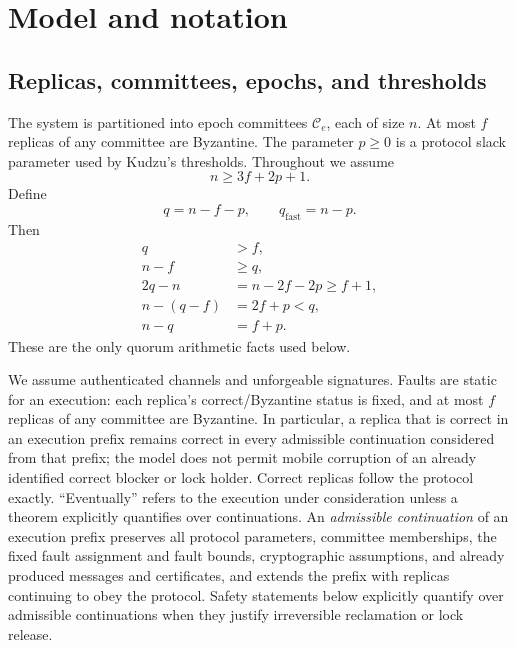 \documentclass[11pt]{article}
\theoremstyle{definition}
\theoremstyle{remark}
\newcommand{\C}{\mathcal C}
\begin{document}
\section{Model and notation}

\subsection{Replicas, committees, epochs, and thresholds}

The system is partitioned into epoch committees $\C_e$, each of size $n$. At most $f$ replicas of any committee are Byzantine. The parameter $p\ge0$ is a protocol slack parameter used by Kudzu's thresholds. Throughout we assume
\begin{equation}
  n\ge 3f+2p+1.
  \label{eq:resilience}
\end{equation}
Define
\begin{equation}
  q=n-f-p,
  \qquad
  q_{\mathrm{fast}}=n-p.
  \label{eq:thresholds}
\end{equation}
Then
\begin{align}
  q &> f, \\
  n-f &\ge q, \\
  2q-n &= n-2f-2p\ge f+1,
  \label{eq:qqintersect}\\
  n-(q-f)&=2f+p<q, \\
  n-q&=f+p.
\end{align}
These are the only quorum arithmetic facts used below.

We assume authenticated channels and unforgeable signatures. Faults are static for an execution: each replica's correct/Byzantine status is fixed, and at most $f$ replicas of any committee are Byzantine. In particular, a replica that is correct in an execution prefix remains correct in every admissible continuation considered from that prefix; the model does not permit mobile corruption of an already identified correct blocker or lock holder. Correct replicas follow the protocol exactly. ``Eventually'' refers to the execution under consideration unless a theorem explicitly quantifies over continuations. An \emph{admissible continuation} of an execution prefix preserves all protocol parameters, committee memberships, the fixed fault assignment and fault bounds, cryptographic assumptions, and already produced messages and certificates, and extends the prefix with replicas continuing to obey the protocol. Safety statements below explicitly quantify over admissible continuations when they justify irreversible reclamation or lock release.
\end{document}
